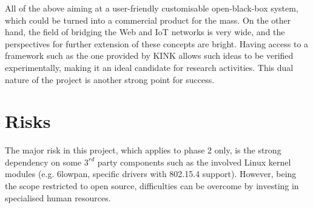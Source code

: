 \documentclass[12pt]{article}
\begin{document}
All of the above aiming at a user-friendly customisable open-black-box system, which could be turned into a commercial product for the mass. On the other hand, the field of bridging the Web and IoT networks is very wide, and the perspectives for further extension of these concepts are bright. Having access to a framework such as the one provided by KINK allows such ideas to be verified experimentally, making it an ideal candidate for research activities. This dual nature of the project is another strong point for success.

\section{Risks}

The major risk in this project, which applies to phase 2 only, is the strong dependency on some $3^{rd}$ party components such as the involved Linux kernel modules (e.g. 6lowpan, specific drivers with 802.15.4 support). However, being the scope restricted to open source, difficulties can be overcome by investing in specialised human resources. 
\end{document}
